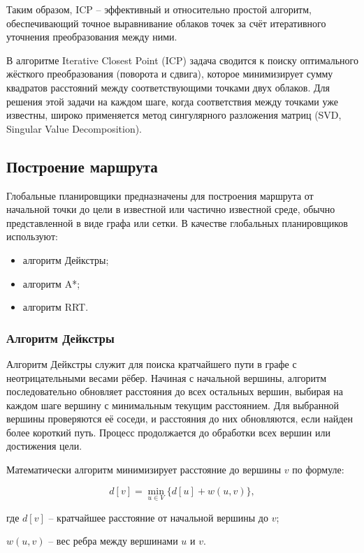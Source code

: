 Таким образом, ICP -- эффективный и относительно простой алгоритм,
обеспечивающий точное выравнивание облаков точек за счёт итеративного уточнения
преобразования между ними.

В алгоритме Iterative Closest Point (ICP) задача сводится к поиску оптимального
жёсткого преобразования (поворота и сдвига), которое минимизирует сумму
квадратов расстояний между соответствующими точками двух облаков. Для решения
этой задачи на каждом шаге, когда соответствия между точками уже известны,
широко применяется метод сингулярного разложения матриц (SVD, Singular Value
Decomposition).

\subsection{Построение маршрута}
Глобальные планировщики предназначены для построения маршрута от начальной точки
до цели в известной или частично известной среде, обычно представленной в виде
графа или сетки. В качестве глобальных планировщиков используют:
\begin{itemize}
	\item алгоритм Дейкстры;
	\item алгоритм A*;
	\item алгоритм RRT.
\end{itemize}

\subsubsection{Алгоритм Дейкстры}

Алгоритм Дейкстры служит для поиска кратчайшего пути в графе с неотрицательными
весами рёбер. Начиная с начальной вершины, алгоритм последовательно обновляет
расстояния до всех остальных вершин, выбирая на каждом шаге вершину с
минимальным текущим расстоянием. Для выбранной вершины проверяются её соседи, и
расстояния до них обновляются, если найден более короткий путь. Процесс
продолжается до обработки всех вершин или достижения цели.

Математически алгоритм минимизирует расстояние до вершины $v$ по формуле:

\begin{equation}
d[v] = \min_{u \in V} \{ d[u] + w(u, v) \},
\end{equation}

\begin{explanationx}
\item[где] $d[v]$ -- кратчайшее расстояние от начальной вершины до $v$;
\item $w(u, v)$ -- вес ребра между вершинами $u$ и $v$.
\end{explanationx}

